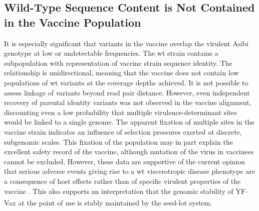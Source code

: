 \subsection{Wild-Type Sequence Content is Not Contained in the Vaccine Population}
It is especially significant that variants in the vaccine overlap the virulent Asibi genotype at low or undetectable frequencies. The \gls{wt} strain contains a subpopulation with representation of vaccine strain sequence identity. The relationship is unidirectional, meaning that the vaccine does not contain low populations of \gls{wt} variants at the coverage depths achieved. It is not possible to assess linkage of variants beyond read pair distance. However, even independent recovery of parental identity variants was not observed in the vaccine alignment, discounting even a low probability that multiple virulence-determinant sites would be linked to a single genome. The apparent fixation of multiple sites in the vaccine strain indicates an influence of selection pressures exerted at discrete, subgenomic scales. This fixation of the population may in part explain the excellent safety record of the vaccine, although mutation of the virus in vaccinees cannot be excluded. However, these data are supportive of the current opinion that serious adverse events giving rise to a \gls{wt} viscerotropic disease phenotype are a consequence of host effects rather than of specific virulent properties of the vaccine \parencite{Barban:2007hi}.  This also supports an interpretation that the genomic stability of YF--Vax\textsuperscript{\textregistered}  at the point of use is stably maintained by the seed-lot system.

